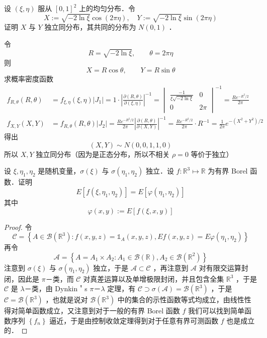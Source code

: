 \begin{exercise}
    设 $(\xi, \eta)$ 服从 $[0,1]^2$ 上的均匀分布．令
    $$
    X:=\sqrt{-2 \ln \xi} \cos (2 \pi \eta), \quad Y:=\sqrt{-2 \ln \xi} \sin (2 \pi \eta)
    $$
    证明 $X$ 与 $Y$ 独立同分布，其共同的分布为 $N(0,1)$ ．
\end{exercise}

\begin{solution}
    令
    $$
R=\sqrt{ -2\ln \xi },\qquad \theta=2\pi \eta
$$
则
$$
X=R\cos\theta,\qquad Y=R\sin\theta
$$
求概率密度函数
$$
\begin{aligned}
f_{R,\theta}(R,\theta) & =f_{\xi ,\eta}(\xi,\eta)\lvert J_{1} \rvert=1\cdot \left\lvert  \frac{\partial (R,\theta)}{\partial (\xi,\eta)}  \right\rvert ^{-1}=\begin{vmatrix}
\frac{-1}{\xi \sqrt{ -2\ln \xi }} & 0 \\
0 & 2\pi
\end{vmatrix}^{-1}=\frac{Re^{ -R^{2}/2 }}{2\pi}   \\
f_{X,Y}(X,Y) & =f_{R,\theta}(R,\theta)\lvert J_{2} \rvert =\frac{Re^{ -R^{2}/2 }}{2\pi}\left\lvert  \frac{\partial (R,\theta)}{\partial (X,Y)}  \right\rvert ^{-1}=\frac{R e^{ -R^{2}/2 }}{2\pi}\cdot R^{-1}=\frac{1}{2\pi }e^{ -(X^{2}+Y^{2})/2 } 
\end{aligned}
$$
得出
$$
(X,Y)\sim N(0,0,1,1,0)
$$
所以  $X,Y$ 独立同分布（因为是正态分布，所以不相关 $\displaystyle \rho=0$ 等价于独立）

\end{solution}
\begin{exercise}
    设 $\xi, \eta_1, \eta_2$ 是随机变量，$\sigma(\xi)$ 与 $\sigma\left(\eta_1, \eta_2\right)$ 独立．设 $f: \mathbb{R}^3 \mapsto \mathbb{R}$ 为有界 Borel 函数．证明
    $$
        E\left[f\left(\xi, \eta_1, \eta_2\right)\right]=E\left[\varphi\left(\eta_1, \eta_2\right)\right]
    $$
    其中
    $$
        \varphi(x, y):=E[f(\xi, x, y)]
    $$
\end{exercise}
\begin{proof}
    令
    $$
        \mathscr{C}=\left\{A \in \mathscr{B}\left(\mathbb{R}^3\right): f(x, y, z)=\mathbb{1}_A(x, y, z), E f(x, y, z)=E \varphi\left(\eta_1, \eta_2\right)\right\}
    $$
    再令
    $$
        \mathscr{A}=\left\{A=A_1 \times A_2: A_1 \in \mathscr{B}(\mathbb{R}), A_2 \in \mathscr{B}\left(\mathbb{R}^2\right)\right\}
    $$
    注意到 $\sigma(\xi)$ 与 $\sigma\left(\eta_1, \eta_2\right)$ 独立，于是 $\mathscr{A} \subset \mathscr{C}$ ，再注意到 $\mathscr{A}$ 对有限交运算封闭，因此是 $\pi$－类，而 $\mathscr{C}$ 对真差运算以及单增极限封闭，并且包含全集 $\mathbb{R}^3$ ，于是 $\mathscr{C}$ 是 $\lambda$－类，由 Dynkin＇s $\pi$－$\lambda$ 定理，有 $\mathscr{C} \supset \sigma(\mathscr{A})=\mathscr{B}\left(\mathbb{R}^3\right)$ ，于是 $\mathscr{C}=\mathscr{B}\left(\mathbb{R}^3\right)$ ，也就是说对 $\mathscr{B}\left(\mathbb{R}^3\right)$ 中的集合的示性函数等式均成立，由线性性得对简单函数成立，又注意到对于一般的有界 Borel 函数 $f$ 我们可以找到简单函数序列 $\left\{f_n\right\}$ 逼近，于是由控制收敛定理得到对于任意有界可测函数 $f$ 也是成立的．
\end{proof}
